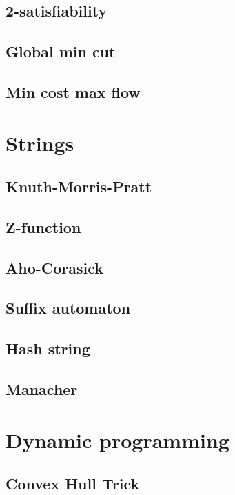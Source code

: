 \documentclass[10pt]{article}
\begin{document}
\subsection{2-satisfiability}

\subsection{Global min cut}

\subsection{Min cost max flow}


\section{Strings}
\subsection{Knuth-Morris-Pratt}

\subsection{Z-function}

\subsection{Aho-Corasick}

\subsection{Suffix automaton}

\subsection{Hash string}

\subsection{Manacher}


\section{Dynamic programming}
\subsection{Convex Hull Trick}

\end{document}

